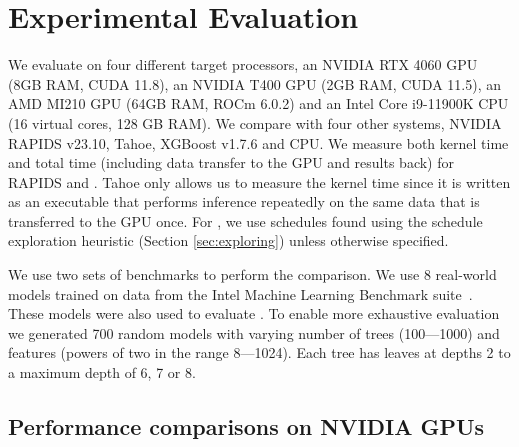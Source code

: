 \section{Experimental Evaluation}
\label{sec:results}

We evaluate \Treebeard{} on four different target processors, an NVIDIA RTX 4060 GPU (8GB RAM, CUDA 11.8),
an NVIDIA T400 GPU (2GB RAM, CUDA 11.5), an AMD MI210 GPU (64GB RAM, ROCm 6.0.2) and an 
Intel Core i9-11900K CPU (16 virtual cores, 128 GB RAM). We compare \Treebeard{} with 
four other systems, NVIDIA RAPIDS\cite{RAPIDS} v23.10, Tahoe\cite{Tahoe}, XGBoost\cite{XGBoost}
v1.7.6 and \TreebeardOLD{}\cite{Treebeard} CPU. 
We measure both kernel time and total time (including data transfer to the GPU and results back) 
for RAPIDS and \Treebeard{}. Tahoe only allows us to measure the kernel time since it is written
as an executable that performs inference repeatedly on the same data that is transferred to the GPU once.
For \Treebeard{}, we use schedules found using the schedule exploration
heuristic (Section \ref{sec:exploring}) unless otherwise specified.

We use two sets of benchmarks to perform the comparison.
We use 8 real-world models trained on data from the Intel Machine 
Learning Benchmark suite~\cite{MLBenchmarks}. These models were also
used to evaluate \TreebeardOLD{}\cite{Treebeard}.
To enable more exhaustive evaluation we generated 700 random models with
varying number of trees (100---1000) and features (powers of two in the range 8---1024). 
Each tree has leaves at depths 2 to a maximum depth of 6, 7 or 8.

\subsection{Performance comparisons on NVIDIA GPUs}

